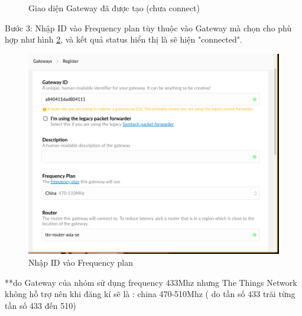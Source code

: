 \begin{description}
\begin{figure}[H]
        \caption{Giao diện Gateway đã được tạo (chưa connect)}
        \label{fig:gateway_console}
    \end{figure}
    \item Bước 3: Nhập ID vào Frequency plan tùy thuộc vào Gateway mà chọn cho phù hợp như hình \ref{fig:choose_gateway}, và kết quả status hiển thị là sẽ hiện "connected".
    \begin{figure}[H]
        \centering
        \includegraphics[width=\textwidth]{images/Quanh/Gateway_choose.png}
        \caption{Nhập ID vào Frequency plan}
        \label{fig:choose_gateway}
    \end{figure}
\end{description}
**do Gateway của nhóm sử dụng frequency 433Mhz nhưng The Things Network không hỗ trợ nên khi đăng kí sẽ là : china 470-510Mhz ( do tần số 433 trãi từng tần số 433 đến 510)

